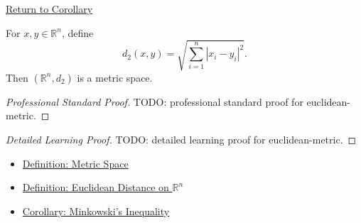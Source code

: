 \newpage
{}
\label{prf:euclidean-metric}

\begin{remark*}[Return]
\hyperref[cor:euclidean-metric]{Return to Corollary}
\end{remark*}

\begin{corollary*}
For \(x,y\in\mathbb{R}^n\), define
\[
  d_2(x,y)=\sqrt{\sum_{i=1}^{n}|x_i-y_i|^2}.
\]
Then \((\mathbb{R}^n,d_2)\) is a metric space.
\end{corollary*}

\begin{proof}[Professional Standard Proof]
\LRAProofBodyStart
TODO: professional standard proof for euclidean-metric.
\end{proof}

\begin{proof}[Detailed Learning Proof]
\LRAProofBodyStart
TODO: detailed learning proof for euclidean-metric.
\end{proof}

\begin{remark*}
\end{remark*}

\begin{dependencies}
\begin{itemize}
  \item \hyperref[def:metric-space]{Definition: Metric Space}
  \item \hyperref[def:euclidean-distance-rn]{Definition: Euclidean Distance on \(\mathbb{R}^n\)}
  \item \hyperref[cor:minkowski-inequality-rn]{Corollary: Minkowski's Inequality}
\end{itemize}
\end{dependencies}

\clearpage
